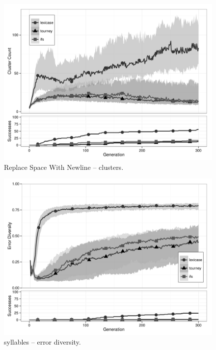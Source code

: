 \begin{figure}%
\centering
\includegraphics[width=11.5cm]{replace-space-with-newline-cluster.pdf}
\caption{Replace Space With Newline -- clusters.}
\label{rswnClu}
\end{figure}

\begin{figure}%
\centering
\includegraphics[width=11.5cm]{syllables-diversity.pdf}
\caption{syllables -- error diversity.}
\label{syllablesDiv}
\end{figure}

